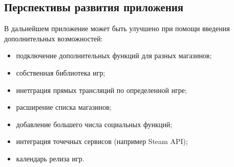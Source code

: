 \subsection{Перспективы развития приложения}
В дальнейшем приложение может быть улучшено при помощи введения дополнительных возможностей:
\begin{itemize}
  \item подключение дополнительных функций для разных магазинов;
  \item собственная библиотека игр;
  \item инетграция прямых трансляций по определенной игре;
  \item расширение списка магазинов;
  \item добавление большего числа социальных функций;
  \item интеграция точечных сервисов (например Steam API);
  \item календарь релиза игр.
\end{itemize}
